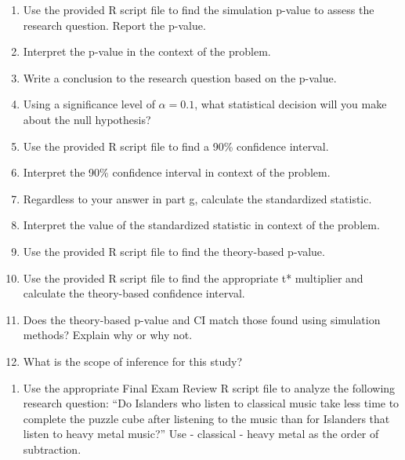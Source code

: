 \documentclass[
]{report}
\providecommand{\tightlist}{%
  \setlength{\itemsep}{0pt}\setlength{\parskip}{0pt}}
\begin{document}
\begin{enumerate}
\def\labelenumi{\alph{enumi}.}
\setcounter{enumi}{7}
\item
  Use the provided R script file to find the simulation p-value to assess the research question. Report the p-value.
  \vspace{0.3in}
\item
  Interpret the p-value in the context of the problem.
  \vspace{0.8in}
\item
  Write a conclusion to the research question based on the p-value.
  \vspace{0.8in}
\item
  Using a significance level of \(\alpha = 0.1\), what statistical decision will you make about the null hypothesis?
  \vspace{0.3in}
\item
  Use the provided R script file to find a 90\% confidence interval.
  \vspace{0.3in}
\item
  Interpret the 90\% confidence interval in context of the problem.
  \vspace{0.8in}
\item
  Regardless to your answer in part g, calculate the standardized statistic.
  \vspace{0.4in}
\item
  Interpret the value of the standardized statistic in context of the problem.
  \vspace{0.8in}
\item
  Use the provided R script file to find the theory-based p-value.
  \vspace{0.3in}
\item
  Use the provided R script file to find the appropriate t* multiplier and calculate the theory-based confidence interval.
  \vspace{0.5in}
\item
  Does the theory-based p-value and CI match those found using simulation methods? Explain why or why not.
  \vspace{0.8in}
\item
  What is the scope of inference for this study?
  \vspace{0.8in}
\end{enumerate}

\begin{enumerate}
\def\labelenumi{\arabic{enumi}.}
\setcounter{enumi}{1}
\tightlist
\item
  Use the appropriate Final Exam Review R script file to analyze the following research question: ``Do Islanders who listen to classical music take less time to complete the puzzle cube after listening to the music than for Islanders that listen to heavy metal music?'' Use - classical - heavy metal as the order of subtraction.
\end{enumerate}
\end{document}

